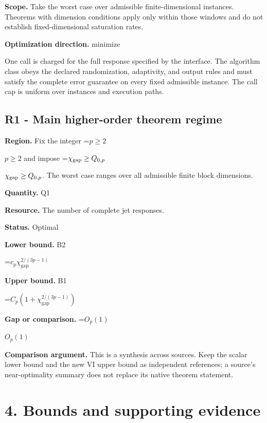 \documentclass[10pt,a4paper]{article}
\newcommand{\AtlasMath}[1]{\par\begingroup\centering\setbox0=\hbox{$\displaystyle #1$}\ifdim\wd0>1.4\linewidth\typeout{ATLAS WIDE FORMULA: \the\wd0}\fi\ifdim\wd0>\linewidth\resizebox{\linewidth}{!}{\box0}\else\box0\fi\par\endgroup}
\newcommand{\AtlasInlineMath}[1]{\begingroup\setbox0=\hbox{$#1$}\ifdim\wd0>.4\linewidth\endgroup\AtlasMath{#1}\else\endgroup$#1$\fi}
\begin{document}
\textbf{Scope.} Take the worst case over admissible finite-dimensional instances. Theorems with dimension conditions apply only within those windows and do not establish fixed-dimensional saturation rates.



\textbf{Optimization direction.} minimize



One call is charged for the full response specified by the interface. The algorithm class obeys the declared randomization, adaptivity, and output rules and must satisfy the complete error guarantee on every fixed admissible instance. The call cap is uniform over instances and execution paths.



\subsection{R1 - Main higher-order theorem regime}


\textbf{Region.} Fix the integer \AtlasInlineMath{p\ge2} and impose \AtlasInlineMath{\chi_{\rm gap}\ge Q_{0,p}}. The worst case ranges over all admissible finite block dimensions.



\textbf{Quantity.} Q1



\textbf{Resource.} The number of complete jet responses.



\textbf{Status.} Optimal



\textbf{Lower bound.} B2



\AtlasMath{c_p\chi_{\mathrm{gap}}^{2/(3p-1)}}


\textbf{Upper bound.} B1



\AtlasMath{C_p(1+\chi_{\mathrm{gap}}^{2/(3p-1)})}


\textbf{Gap or comparison.} \AtlasInlineMath{O_p(1)}



\textbf{Comparison argument.} This is a synthesis across sources. Keep the scalar lower bound and the new VI upper bound as independent references; a source's near-optimality summary does not replace its native theorem statement.



\section{4. Bounds and supporting evidence}
\end{document}
